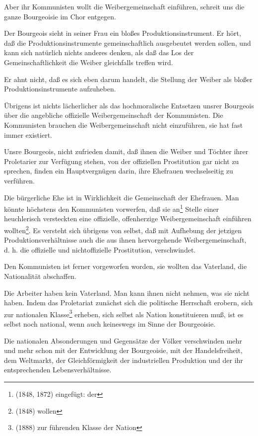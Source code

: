 \documentclass[letterpaper]{article}
\begin{document}
Aber ihr Kommunisten wollt die Weibergemeinschaft einführen, schreit uns die ganze Bourgeoisie im Chor entgegen.

Der Bourgeois sieht in seiner Frau ein bloßes Produktionsinstrument. Er hört, daß die Produktionsinstrumente gemeinschaftlich ausgebeutet werden sollen, und kann sich natürlich nichts anderes denken, als daß das Los der Gemeinschaftlichkeit die Weiber gleichfalls treffen wird.

Er ahnt nicht, daß es sich eben darum handelt, die Stellung der Weiber als bloßer Produktionsinstrumente aufzuheben.

Übrigens ist nichts lächerlicher als das hochmoralische Entsetzen unsrer Bourgeois über die angebliche offizielle Weibergemeinschaft der Kommunisten. Die Kommunisten brauchen die Weibergemeinschaft nicht einzuführen, sie hat fast immer existiert.

Unsre Bourgeois, nicht zufrieden damit, daß ihnen die Weiber und Töchter ihrer Proletarier zur Verfügung stehen, von der offiziellen Prostitution gar nicht zu sprechen, finden ein Hauptvergnügen darin, ihre Ehefrauen wechselseitig zu verführen.

Die bürgerliche Ehe ist in Wirklichkeit die Gemeinschaft der Ehefrauen. Man könnte höchstens den Kommunisten vorwerfen, daß sie an\footnote{(1848, 1872) eingefügt: der} Stelle einer heuchlerisch versteckten eine offizielle, offenherzige Weibergemeinschaft einführen wollten\footnote{(1848) wollen}. Es versteht sich übrigens von selbst, daß mit Aufhebung der jetzigen Produktionsverhältnisse auch die aus ihnen hervorgehende Weibergemeinschaft, d. h. die offizielle und nichtoffizielle Prostitution, verschwindet.

Den Kommunisten ist ferner vorgeworfen worden, sie wollten das Vaterland, die Nationalität abschaffen.

Die Arbeiter haben kein Vaterland. Man kann ihnen nicht nehmen, was sie nicht haben. Indem das Proletariat zunächst sich die politische Herrschaft erobern, sich zur nationalen Klasse\footnote{(1888) zur führenden Klasse der Nation} erheben, sich selbst als Nation konstituieren muß, ist es selbst noch national, wenn auch keineswegs im Sinne der Bourgeoisie.

Die nationalen Absonderungen und Gegensätze der Völker verschwinden mehr und mehr schon mit der Entwicklung der Bourgeoisie, mit der Handelsfreiheit, dem Weltmarkt, der Gleichförmigkeit der industriellen Produktion und der ihr entsprechenden Lebensverhältnisse.
\end{document}
